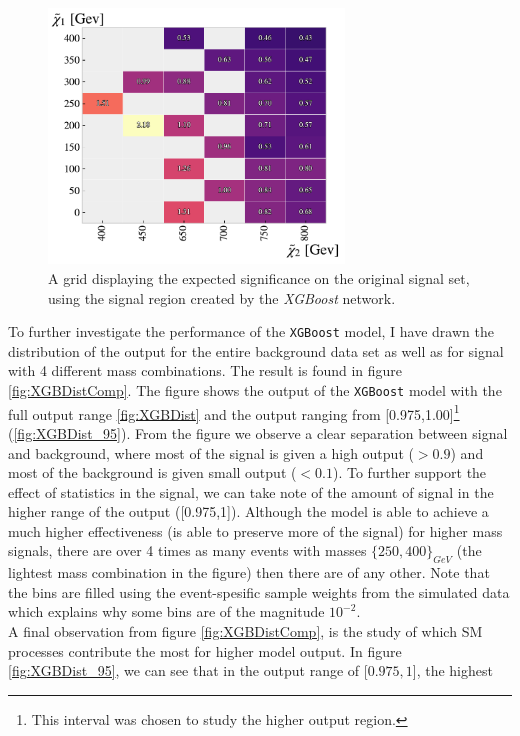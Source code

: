 \begin{figure}
    \centering
    \includegraphics[width=0.7\textwidth]{Figures/MLResults/XGB/SUSY/Grid/XGBGridSig.pdf}
    \caption{A grid displaying the expected significance on the original signal set, using the signal region 
    created by the \emph{XGBoost} network.}
    \label{fig:XGBoost}
\end{figure}
To further investigate the performance of the \verb!XGBoost! model, I have drawn the distribution of the output for the 
entire background data set as well as for signal with 4 different mass combinations. The result is found in figure 
\ref{fig:XGBDistComp}. The figure shows the output of the \verb!XGBoost! model with the full output range \ref{fig:XGBDist}
and the output ranging from [0.975,1.00]\footnote{This interval was chosen to study the higher output region.} (\ref{fig:XGBDist_95}). 
From the figure we observe a clear separation between signal and background, where most of the signal is given a high output ($>0.9$) 
and most of the background is given small output ($<0.1$). To further support the effect of statistics in the signal, we can take note of the 
amount of signal in the higher range of the output ([0.975,1]). Although the model is able to achieve a much higher 
effectiveness (is able to preserve more of the signal) for higher mass signals, there are over 4 times as many 
events with masses $\{250,400\}_{GeV}$ (the lightest mass combination in the figure) then there are of any other. Note 
that the bins are filled using the event-spesific sample weights from the simulated data which explains why some bins
are of the magnitude $10^{-2}$.
\\
A final observation from figure \ref{fig:XGBDistComp}, is the study of which \ac{SM} processes contribute the most 
for higher model output. In figure \ref{fig:XGBDist_95}, we can see that in the output range of [$0.975,1$], the highest 
